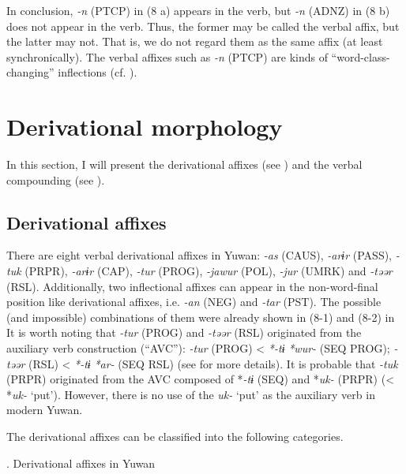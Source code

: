   In conclusion, \textit{{}-n} (PTCP) in (8 a) appears in the verb, but \textit{-n} (ADNZ) in (8 b) does not appear in the verb. Thus, the former may be called the verbal affix, but the latter may not. That is, we do not regard them as the same affix (at least synchronically). The verbal affixes such as \textit{{}-n} (PTCP) are kinds of “word-class-changing” inflections (cf. \citealt{Haspelmath1996}).

\section{Derivational morphology}

In this section, I will present the derivational affixes (see ) and the verbal compounding (see ).

\subsection{Derivational affixes}

There are eight verbal derivational affixes in Yuwan: \textit{{}-as} (CAUS), \textit{{}-arɨr} (PASS), \textit{{}-tuk} (PRPR), \textit{-arɨr} (CAP), \textit{{}-tur} (PROG), \textit{{}-jawur} (POL), \textit{-jur} (UMRK) and \textit{{}-təər} (RSL). Additionally, two inflectional affixes can appear in the non-word-final position like derivational affixes, i.e. \textit{{}-an} (NEG) and \textit{{}-tar} (PST). The possible (and impossible) combinations of them were already shown in (8-1) and (8-2) in  It is worth noting that \textit{-tur} (PROG) and \textit{{}-təər} (RSL) originated from the auxiliary verb construction (“AVC”): \textit{{}-tur} (PROG) < \textit{*-tɨ} \textit{*wur-} (SEQ PROG); \textit{{}-təər} (RSL) < \textit{*-tɨ} \textit{*ar-} (SEQ RSL) (see  for more details). It is probable that \textit{{}-tuk} (PRPR) originated from the AVC composed of *\textit{{}-tɨ} (SEQ) and *\textit{uk-} (PRPR) (< *\textit{uk-} ‘put’). However, there is no use of the \textit{uk-} ‘put’ as the auxiliary verb in modern Yuwan.

  The derivational affixes can be classified into the following categories.

\begin{styleBeschriftung}
\textmd{}\textmd{. Derivational affixes in Yuwan}
\end{styleBeschriftung}

